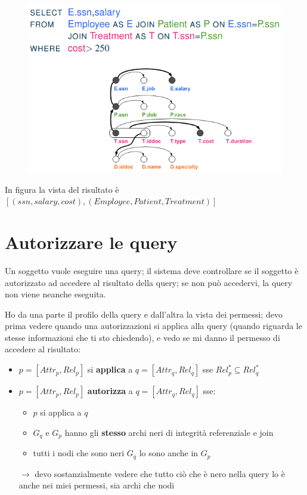 \documentclass{report}
\begin{document}
\begin{figure}[H]
    \centering
    \includegraphics[width=1\linewidth]{images/view-graph2.png}
\end{figure}

\noindent In figura la vista del risultato è $[(ssn, salary, cost), (Employee, Patient, Treatment)]$


\section{Autorizzare le query}
Un soggetto vuole eseguire una query; il sistema deve controllare se il soggetto è autorizzato ad accedere al risultato della query; se 
non può accedervi, la query non viene neanche eseguita.

\noindent Ho da una parte il profilo della query e dall'altra la vista dei permessi; devo prima vedere quando una autorizzazioni si applica alla query (quando 
riguarda le stesse informazioni che ti sto chiedendo), e vedo se mi danno il permesso di accedere al risultato:

\begin{itemize}
    \item $p = [Attr_p, Rel_p]$ si \textbf{applica} a $q = [Attr_q, Rel_q]$ sse $Rel^*_p \subseteq Rel^*_q$
    \item $p = [Attr_p, Rel_p]$ \textbf{autorizza} a $q = [Attr_q, Rel_q]$ sse:
    \begin{itemize}
        \item $p$ si applica a $q$
        \item $G_q$ e $G_p$ hanno gli \textbf{stesso} archi neri di integrità referenziale e join
        \item tutti i nodi che sono neri $G_q$ lo sono anche in $G_p$
    \end{itemize}

    $\rightarrow$ devo sostanzialmente vedere che tutto ciò che è nero nella query lo è anche nei miei permessi, sia archi che nodi
\end{itemize}
\end{document}
